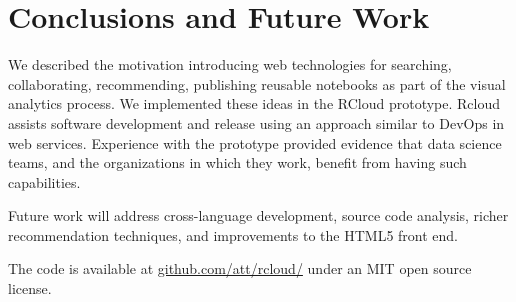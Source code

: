 \section{Conclusions and Future Work}

We described the motivation introducing web technologies
for searching, collaborating, recommending, publishing
reusable notebooks as part of the visual analytics process.
We implemented these ideas in the RCloud prototype.
Rcloud assists software development and release using
an approach similar to DevOps in web services.
Experience with the prototype provided evidence that
data science teams, and the organizations in which they work,
benefit from having such capabilities.

Future work will address cross-language development,
source code analysis, richer recommendation techniques,
and improvements to the HTML5 front end.

The code is available 
at \url{github.com/att/rcloud/}
under an MIT open source license.
